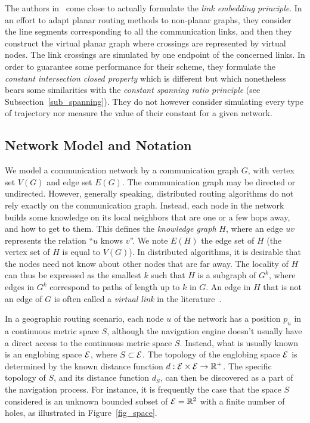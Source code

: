 \documentclass{article}
\newcommand{\englobing}{{\cal E}}
\begin{document}
The authors in~\cite{bib_embedding} come close to actually formulate the {\em link embedding principle}. In an effort to adapt planar routing methods to non-planar graphs, they consider the line segments corresponding to all the communication links, and then they construct the virtual planar graph where crossings are represented by virtual nodes. The link crossings are simulated by one endpoint of the concerned links. In order to guarantee some performance for their scheme, they formulate the {\em constant intersection closed property} which is different but which nonetheless bears some similarities with the {\em constant spanning ratio principle} (see Subsection~\ref{sub_spanning}). They do not however consider simulating every type of trajectory
 nor measure the value of their constant for a given network.
 
\subsection*{Network Model and Notation}
We model a communication network by a communication graph $G$, with vertex set $V(G)$ and edge set $E(G)$. The communication graph may be directed or undirected. However, generally speaking, distributed routing algorithms do not rely exactly on the communication graph. Instead, each node in the network builds some knowledge on its local neighbors that are one or a few hops away, and how to get to them.  This defines the {\em knowledge graph} $H$, where an edge $uv$ represents the relation ``$u$ knows $v$''. We note $E(H)$ the edge set of $H$ (the vertex set of $H$ is equal to $V(G)$).
In distributed algorithms, it is desirable that the nodes need not know about other nodes that are far away.
The locality of $H$ can thus be expressed as the smallest $k$ such that $H$ is a subgraph of $G^k$, where edges in $G^k$ correspond to paths of length up to $k$ in $G$. An edge in $H$ that is not an edge of $G$ is often called a {\em virtual link} in the literature~\cite{bib_book}.


In a geographic routing scenario, each node $u$ of the network has a position $p_u$ in a continuous metric space $S$, although the navigation engine doesn't usually have a direct access to the continuous metric space $S$. Instead, what is usually known is an englobing space $\englobing$, where $S\subset\englobing$. The topology of the englobing space $\englobing$ is determined by the known distance function $d:\englobing\times\englobing\rightarrow\mathbb{R}^+$.
The specific topology of $S$, and its distance function $d_S$, can then be discovered as a part of the navigation process. For instance, it is frequently the case that the space $S$ considered is an unknown bounded subset of $\englobing=\mathbb{R}^2$ with a finite number of holes, as illustrated in Figure~\ref{fig_space}.
\end{document}
